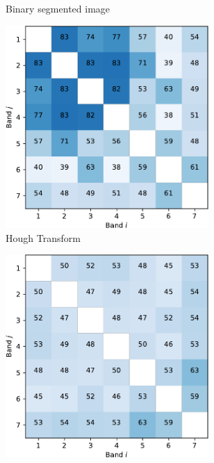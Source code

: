 \documentclass{article}
\begin{document}
\begin{figure}[h]
\begin{subfigure}[b]{0.49\linewidth}
    \caption{Binary segmented image} 
    \label{fig7:b} 
    \end{subfigure} 
  \begin{subfigure}[b]{0.49\linewidth}
    \centering
    \includegraphics[width=0.85\textwidth]{kmeans-crop.pdf} 
    \caption{Hough Transform} 
    \label{fig7:c} 
  \end{subfigure}%
  \begin{subfigure}[b]{0.49\linewidth}
    \centering
    \includegraphics[width=0.85\textwidth]{gmm-crop.pdf} 

\end{subfigure}
\end{figure}
\end{document}
